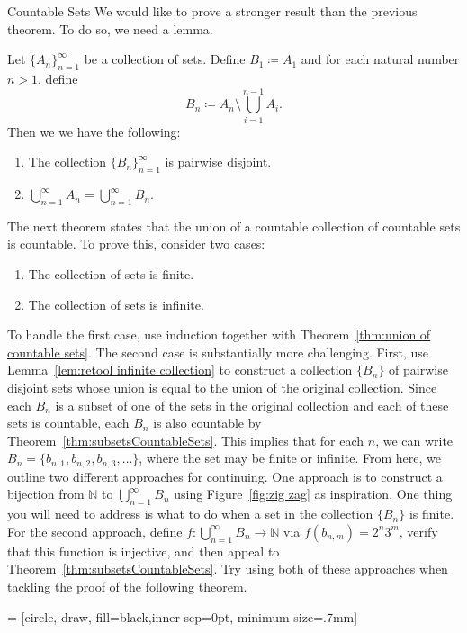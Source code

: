\begin{section}{Countable Sets}
We would like to prove a stronger result than the previous theorem. To do so, we need a lemma. 

\begin{lemma}\label{lem:retool infinite collection}
Let $\{A_n\}_{n=1}^{\infty}$ be a collection of sets. Define $B_1\coloneqq A_1$ and for each natural number $n>1$, define
\[
B_n\coloneqq A_n\setminus \bigcup_{i=1}^{n-1}A_i.
\]
Then we we have the following:
\begin{enumerate}[label=\textrm{(\alph*)}]
\item The collection $\{B_n\}_{n=1}^{\infty}$ is pairwise disjoint.
\item $\displaystyle \bigcup_{n=1}^{\infty}A_n =\bigcup_{n=1}^{\infty}B_n$.
\end{enumerate}
\end{lemma}

The next theorem states that the union of a countable collection of countable sets is countable. To prove this, consider two cases:
\begin{enumerate}
\item The collection of sets is finite.  
\item The collection of sets is infinite.
\end{enumerate}
To handle the first case, use induction together with Theorem~\ref{thm:union of countable sets}. The second case is substantially more challenging.  First, use Lemma~\ref{lem:retool infinite collection} to construct a collection $\{B_n\}$ of pairwise disjoint sets whose union is equal to the union of the original collection. Since each $B_n$ is a subset of one of the sets in the original collection and each of these sets is countable, each $B_n$ is also countable by Theorem~\ref{thm:subsetsCountableSets}. This implies that for each $n$, we can write $B_n=\{b_{n,1}, b_{n,2},b_{n,3},\ldots\}$, where the set may be finite or infinite. From here, we outline two different approaches for continuing.  One approach is to construct a bijection from $\mathbb{N}$ to $\bigcup_{n=1}^{\infty}B_n$ using Figure~\ref{fig:zig zag} as inspiration.  One thing you will need to address is what to do when a set in the collection $\{B_n\}$ is finite. For the second approach, define $f:\bigcup_{n=1}^{\infty}B_n\to \mathbb{N}$ via $f(b_{n,m})=2^n3^m$, verify that this function is injective, and then appeal to Theorem~\ref{thm:subsetsCountableSets}.  Try using both of these approaches when tackling the proof of the following theorem.

 = [circle, draw, fill=black,inner sep=0pt, minimum size=.7mm]


\end{section}
